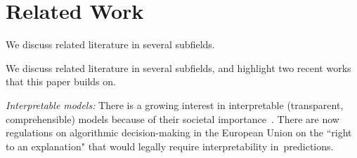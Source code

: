 %
%
%
%
%
%

\section{Related Work}

\begin{kdd}
We discuss related literature in several subfields.
\end{kdd}
\begin{arxiv}
We discuss related literature in several subfields, and highlight two recent works that this paper builds on.
\end{arxiv}

\textit{Interpretable models:} There is a growing interest in interpretable (transparent, comprehensible) models because of their societal importance~\citep[see ][]{ruping2006learning,bratko1997machine,dawes1979robust,VellidoEtAl12,Giraud98,Holte93,Schmueli10,Huysmans11,Freitas14}. There are now regulations on algorithmic decision-making in the European Union on the ``right to an explanation" \citep{Goodman2016EU} that would legally require interpretability in~predictions.


